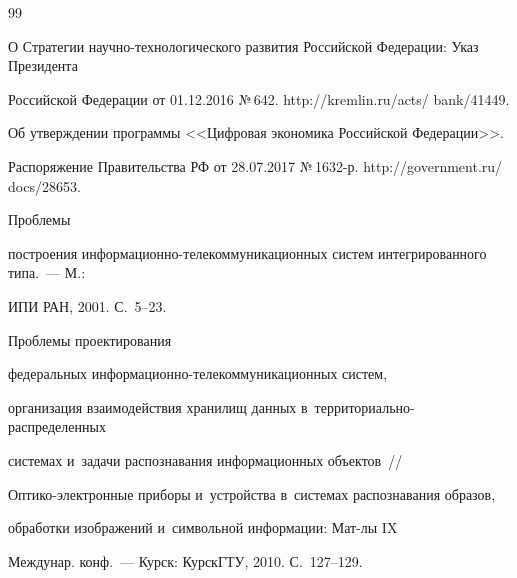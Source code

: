   


{\small\frenchspacing


{ %




\begin{thebibliography}{99}





\vspace*{-3pt}







О Стратегии на\-уч\-но-тех\-но\-ло\-ги\-че\-ско\-го развития Российской Федерации: Указ Президента 


Российской Федерации от 01.12.2016 №\,642. {\sf http://kremlin.ru/acts/ bank/41449}.




Об утверждении программы <<Цифровая экономика Российской Федерации>>. %


Распоряжение Правительства РФ от 28.07.2017 №\,1632-р. {\sf http://government.ru/ docs/28653}.




 Проб\-ле\-мы 


построения ин\-фор\-ма\-ци\-он\-но-те\-ле\-ком\-му\-ни\-ка\-ци\-он\-ных сис\-тем интегрированного типа.~--- М.: 


ИПИ РАН, 2001. С.~5--23.




 Проблемы проектирования 


федеральных ин\-фор\-ма\-ци\-он\-но-те\-ле\-ком\-му\-ни\-ка\-ци\-он\-ных сис\-тем, 


организация взаимодействия хранилищ данных в~территориально-распределенных  


сис\-те\-мах и~задачи распознавания информационных объектов~/\!\!/  


Оп\-ти\-ко-элект\-рон\-ные приборы и~устройства в~сис\-те\-мах распознавания образов, 


обработки изображений и~символьной информации: Мат-лы IX 


Междунар. конф.~--- Курск: КурскГТУ, 2010. С.~127--129.





\end{thebibliography}}}
